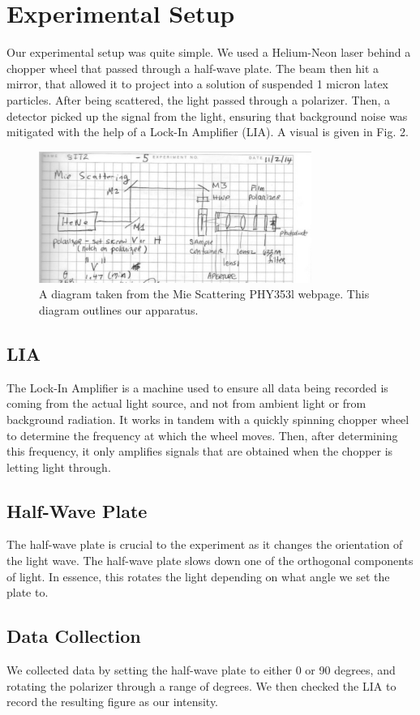 \documentclass[10pt,letterpaper,onecolumn]{article}
\begin{document}
\section{Experimental Setup}
Our experimental setup was quite simple. We used a Helium-Neon laser behind a chopper wheel that 
passed through a half-wave plate. The beam then hit a mirror, that allowed it to project into a solution of suspended 1 micron latex particles. 
After being scattered, the light passed through a polarizer. Then, a detector picked up the signal from the light, ensuring that background noise was mitigated with the help of a Lock-In Amplifier (LIA).
A visual is given in Fig. 2. 
\begin{figure}
    \begin{center}
        \includegraphics*[width=3.5in]{Apparatus.png}
        \caption{A diagram taken from the Mie Scattering PHY353l webpage. This diagram outlines our apparatus.}
    \end{center}
\end{figure}
\subsection{LIA}
The Lock-In Amplifier is a machine used to ensure all data being recorded is coming from the actual light source, and not from ambient light or from background radiation.
It works in tandem with a quickly spinning chopper wheel to determine the frequency at which the wheel moves. Then, after determining this frequency, it only amplifies signals that
are obtained when the chopper is letting light through.
\subsection{Half-Wave Plate}
The half-wave plate is crucial to the experiment as it changes the orientation of the light wave. The half-wave plate 
slows down one of the orthogonal components of light. In essence, this rotates the light depending on what angle we set the plate to.
\subsection{Data Collection}
We collected data by setting the half-wave plate to either 0 or 90 degrees, and rotating the polarizer through a range of degrees. We then checked the LIA to record the resulting figure as our intensity.
\end{document}
